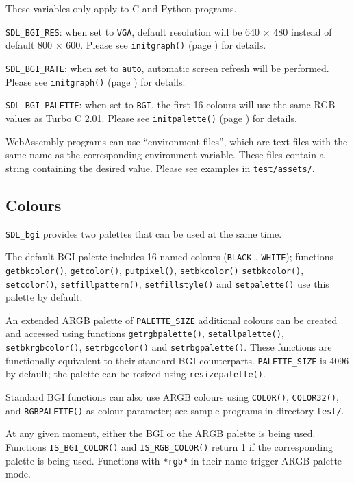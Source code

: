 \documentclass[a4paper,12pt]{article}
\newcommand{\ntt}[1]{\texttt{#1}}
\newcommand{\fn}[1]{\ntt{#1}}        %
\newcommand{\T}[1]{\ntt{#1}}         %
\newcommand{\file}[1]{\ntt{#1}}      %
\newcommand{\SDLbgi}{\texttt{SDL\_bgi}}
\begin{document}
These variables only apply to C and Python programs.

\T{SDL\_BGI\_RES}: when set to \T{VGA}, default resolution will be 640
$\times$ 480 instead of default 800 $\times$ 600. Please see
\fn{initgraph()} (page \pageref{sec:initgraph}) for details.

\T{SDL\_BGI\_RATE}: when set to \T{auto}, automatic screen refresh
will be performed. Please see \fn{initgraph()} (page
\pageref{sec:initgraph}) for details.

\T{SDL\_BGI\_PALETTE}: when set to \T{BGI}, the first 16 colours will
use the same RGB values as Turbo C 2.01. Please see
\fn{initpalette()} (page \pageref{sec:initpalette}) for details.

WebAssembly programs can use ``environment files'', which are text
files with the same name as the corresponding environment variable.
These files contain a string containing the desired value. Please see
examples in \file{test/assets/}.


\subsection{Colours}

\SDLbgi{} provides two palettes that can be used at the same time.

The default BGI palette includes 16 named colours (\T{BLACK}{\ldots}
\T{WHITE}); functions \fn{getbkco\-lor()}, \fn{getcolor()},
\fn{putpixel()}, \fn{setbkcolor()} \fn{setbkcolor()},
\fn{set\-co\-lor()}, \fn{set\-fill\-pat\-tern()}, \fn{setfillstyle()}
and \fn{setpalette()} use this palette by default.

An extended ARGB palette of \T{PALETTE\_SIZE} additional colours can
be created and accessed using functions \fn{getrgbpalette()},
\fn{setallpalette()}, \fn{setbkrgbcolor()}, \fn{set\-rbg\-color()} and
\fn{setrbgpalette()}. These functions are functionally equivalent to
their standard BGI counterparts. \T{PALETTE\_SIZE} is 4096 by default;
the palette can be resized using \fn{resizepalette()}.

Standard BGI functions can also use ARGB colours using \fn{COLOR()},
\fn{COLOR32()}, and \fn{RGBPALETTE()} as colour parameter; see
sample programs in directory \file{test/}.

At any given moment, either the BGI or the ARGB palette is being used.
Functions \T{IS\_BGI\_COLOR()} and \T{IS\_RGB\_COLOR()} return 1 if
the corresponding palette is being used. Functions with \T{*rgb*} in
their name trigger ARGB palette mode.
\end{document}
